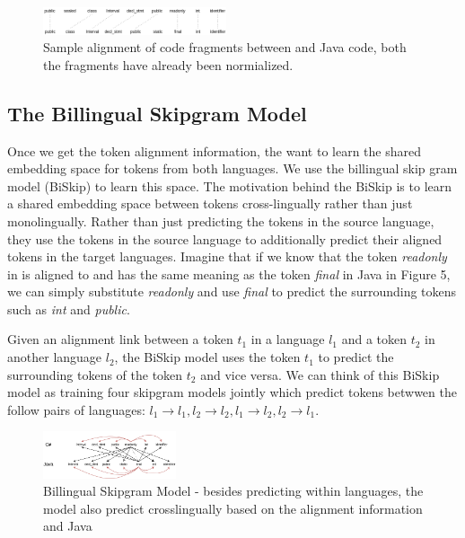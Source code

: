 \begin{figure}[t!]
	
	\includegraphics[width=0.48\textwidth]{alignment}
	\caption{Sample alignment of code fragments between  and Java code, both the fragments have already been normialized.}
	\label{fig:clf}
\end{figure}

\subsection{The Billingual Skipgram Model}

Once we get the token alignment information, the want to learn the shared embedding space for tokens from both languages. We use the billingual skip gram model (BiSkip) \cite{luong2015bilingual} to learn this space. The motivation behind the BiSkip is to learn a shared embedding space between tokens cross-lingually rather than just monolingually. Rather than just predicting the tokens in the source language, they use the tokens in the source language to additionally predict their aligned tokens in the target languages. Imagine that if we know that the token \textit{readonly} in  is aligned to and has the same meaning as the token \textit{final} in Java in Figure 5, we can simply substitute \textit{readonly} and use \textit{final} to predict the surrounding tokens such as \textit{int} and \textit{public}. 

Given an alignment link between a token $t_{1}$ in a language $l_{1}$ and a token $t_{2}$ in another language $l_{2}$, the BiSkip model uses the token $t_{1}$ to predict the surrounding tokens of the token $t_{2}$ and vice versa. We can think of this BiSkip model as training four skipgram models jointly which predict tokens betwwen the follow pairs of languages: $l_{1} \rightarrow l_{1}, l_{2} \rightarrow l_{2}, l_{1} \rightarrow l_{2}, l_{2} \rightarrow l_{1}$.



\begin{figure}[t!]
	\includegraphics[width=0.35\textwidth]{biskip_align}
	\caption{Billingual Skipgram Model - besides predicting within languages, the model also predict crosslingually based on the alignment information  and Java}
	\label{fig:clf}
\end{figure}

